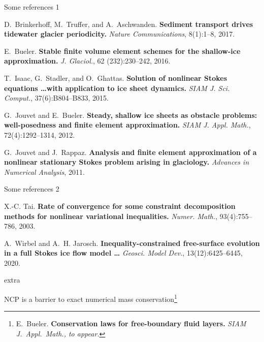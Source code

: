 \documentclass[usepdftitle=false,usenames,dvipsnames]{beamer}
\begin{document}
\appendix

\begin{frame}{Some references 1}
%
%

\begin{thebibliography}{1}
D.~Brinkerhoff, M.~Truffer, and A.~Aschwanden. \textbf{Sediment transport drives tidewater glacier periodicity.} {\em Nature Communications}, 8(1):1--8, 2017.

E.~Bueler. \textbf{Stable finite volume element schemes for the shallow-ice approximation.} {\em J. Glaciol.}, 62 (232):230--242, 2016.

T.~Isaac, G.~Stadler, and O.~Ghattas.  \textbf{Solution of nonlinear Stokes equations \dots with application to ice sheet dynamics.} {\em SIAM J. Sci. Comput.}, 37(6):B804--B833, 2015.

G.~Jouvet and E.~Bueler. \textbf{Steady, shallow ice sheets as obstacle problems: well-posedness and finite element approximation.} {\em SIAM J. Appl. Math.}, 72(4):1292--1314, 2012.

G.~Jouvet and J.~Rappaz. \textbf{Analysis and finite element approximation of a nonlinear stationary {S}tokes problem arising in glaciology.} {\em Advances in Numerical Analysis}, 2011.
\end{thebibliography}
\end{frame}


\begin{frame}{Some references 2}
\begin{thebibliography}{1}
X.-C. Tai. \textbf{Rate of convergence for some constraint decomposition methods for nonlinear variational inequalities.} {\em Numer. Math.}, 93(4):755--786, 2003.

A.~Wirbel and A.~H. Jarosch. \textbf{Inequality-constrained free-surface evolution in a full {S}tokes ice flow model \dots} {\em Geosci. Model Dev.}, 13(12):6425--6445, 2020.
\end{thebibliography}
\end{frame}


\begin{frame}{extra}

NCP is a barrier to exact numerical mass conservation\footnote{E.~Bueler. \textbf{Conservation laws for free-boundary fluid layers.} \em{SIAM J.~Appl.~Math.}, to appear.}
\end{frame}
\end{document}

